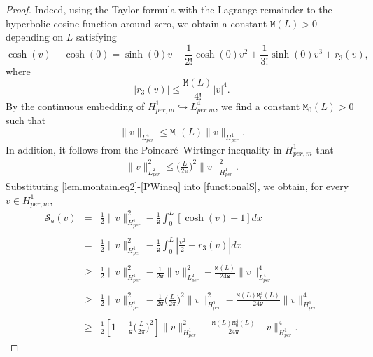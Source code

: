 \documentclass[10pt,a4paper]{amsart}
\begin{document}
 \begin{proof}
 	Indeed, using the Taylor formula with the Lagrange remainder to the hyperbolic cosine function around zero, we obtain a constant $\mathtt{M}(L)>0$ depending on $L$ satisfying %
 	\begin{equation}\label{lem.montain.eq2}
 		\cosh(v)-\cosh(0)=\sinh(0) v+\frac{1}{2!} \cosh(0)v^2+\frac{1}{3!}\sinh(0)v^3+r_3(v),
 	\end{equation}where 
 	\begin{equation}\label{lem.montain.eq2'}
 		|r_3(v)|\leq \frac{\mathtt{M}(L)}{4!}|v|^4. 
 	\end{equation}
 	By the continuous embedding of $H^1_{per,m}\hookrightarrow L^4_{per.m}$, we find a constant $\mathtt{M}_0(L)>0$ such that 
 	\begin{equation}\label{lem.montain.eq3}
 		\|v\|_{L^4_{per}}\leq\mathtt{M}_0(L)  	\|v\|_{H^1_{per}}. 
 	\end{equation}  	 	
 	In addition, it follows from the Poincaré–Wirtinger inequality in $H_{per,m}^1$ that
 	\begin{align}  \label{PWineq}
 		\|v\|^2_{L^2_{per}}\leq 	 \biggl(\frac{L}{2\pi}\biggl)^2\|v\|^2_{H^1_{per}}.
 	\end{align} 
 	Substituting \eqref{lem.montain.eq2}-\eqref{PWineq} into \eqref{functionalS}, we obtain, for every $v\in H^1_{per,m}$,
 	\begin{equation}\label{lem.montain.eq4}\begin{array}{llllllll}
 		\mathcal{S}_\mathtt{w}(v)&=&\displaystyle \frac{1}{2} \|v\|^2_{H^1_{per}} -\frac{1}{\mathtt{w}}\int_{0}^{L} [\cosh(v) -1] dx  \\\\ &= & \displaystyle \frac{1}{2} \|v\|^2_{H^1_{per}} -\frac{1}{\mathtt{w}}\int_{0}^{L} \left|\frac{v^2}{2}+r_3(v)\right| dx \\\\ 
 		&\ge &\displaystyle  \frac{1}{2} \|v\|^2_{H^1_{per}} -\frac{1}{2\mathtt{w}}\|v\|^2_{L^2_{per}}  - \frac{\mathtt{M}(L)}{24\mathtt{w}}\|v\|^4_{L^4_{per}} \\\\&\ge &\displaystyle  \frac{1}{2} \|v\|^2_{H^1_{per}} -\frac{1}{2\mathtt{w}}	 \biggl(\frac{L}{2\pi}\biggl)^2\|v\|^2_{H^1_{per}}  - \frac{\mathtt{M}(L)\mathtt{M}_0^4(L)}{24\mathtt{w}}\|v\|^4_{H^1_{per}} \\\\&\ge & \displaystyle \frac{1}{2}\left[1 - \frac{1}{\mathtt{w}}\biggl(\frac{L}{2\pi}\biggl)^2	 \right]\|v\|^2_{H^1_{per}}  - \frac{\mathtt{M}(L)\mathtt{M}_0^4(L)}{24\mathtt{w}}\|v\|^4_{H^1_{per}}.

\end{array}
\end{equation}
\end{proof}
\end{document}
